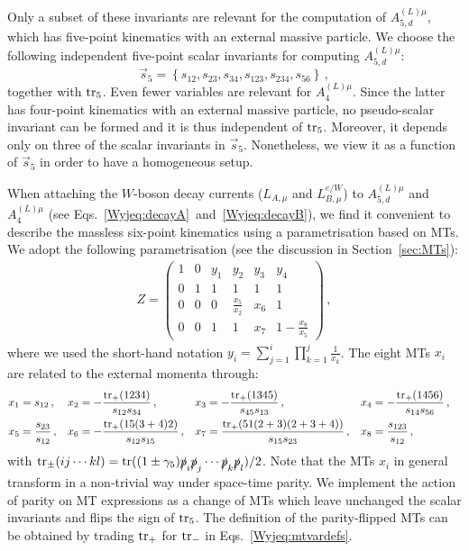 \documentclass[main.tex]{subfiles}
\begin{document}
Only a subset of these invariants are relevant for the computation of $A_{5,d}^{(L)\mu}$, which has five-point kinematics with an external massive particle. We choose the following independent five-point scalar invariants for computing $A_{5,d}^{(L)\mu}$:
\begin{equation}
\vec{s}_{5} = \left\{ s_{12},s_{23},s_{34},s_{123},s_{234},s_{56}\right\} \,,
\label{Wyjeq:sijs5pt}
\end{equation}
together with $\operatorname{\rm tr}_5$. Even fewer variables are relevant for $A_{4}^{(L)\mu}$. Since the latter has four-point kinematics with an external massive particle, no pseudo-scalar invariant can be formed and it is thus independent of $\operatorname{\rm tr}_5$. Moreover, it depends only on three of the scalar invariants in $\vec{s}_5$. Nonetheless, we view it as a function of $\vec{s}_{5}$ in order to have a homogeneous setup.

When attaching the $W$-boson decay currents ($L_{A,\mu}$ and $L^{e/W}_{B,\mu}$) to $A_{5,d}^{(L)\mu}$ and $A_{4}^{(L)\mu}$ (see Eqs.~\ref{Wyjeq:decayA}~and~\ref{Wyjeq:decayB}), we find it convenient to describe the massless six-point kinematics using a parametrisation based on MTs.
We adopt the following parametrisation (see the discussion in Section~\ref{sec:MTs}):
\begin{align}
  Z =
  \begin{pmatrix}
    1 & 0 & y_1 & y_2 & y_3 & y_4\\
    0 & 1 & 1   & 1   & 1   & 1 \\
    0 & 0 & 0   & \tfrac{x_5}{x_2} & x_6 & 1 \\
    0 & 0 & 1   & 1   & x_7 & 1-\tfrac{x_8}{x_5}
  \end{pmatrix} \,,
  \label{Wyjeq:ZmatrixW}
\end{align}
where we used the short-hand notation $y_i = \sum_{j=1}^{i} \prod_{k=1}^{j} \frac{1}{x_k}$. The eight MTs $x_i$ are related to the external momenta through:
\begin{align}
  x_1 &=  s_{12} \,, &
  x_2 &= -\frac{\operatorname{\rm tr}_+(1234)}{s_{12}s_{34}} \,, &
  x_3 &= -\frac{\operatorname{\rm tr}_+(1345)}{s_{45}s_{13}} \,, &
  x_4 &= -\frac{\operatorname{\rm tr}_+(1456)}{s_{14}s_{56}} \,, \nonumber \\
  x_5 &=  \frac{s_{23}}{s_{12}} \,, &
  x_6 &= -\frac{\operatorname{\rm tr}_+(15(3+4)2)}{s_{12}s_{15}} \,, &
  x_7 &=  \frac{\operatorname{\rm tr}_+(51(2+3)(2+3+4))}{s_{15} s_{23}} \,, &
  x_8 &=  \frac{s_{123}}{s_{12}} \,, &
\label{Wyjeq:mtvardefs}
\end{align}
with $\operatorname{\rm tr}_{\pm}(ij \cdots kl) = \operatorname{\rm tr}((1\pm\gamma_5)\slashed{p}_i\slashed{p}_j \cdots\slashed{p}_k\slashed{p}_l)/2$. Note that the MTs $x_i$ in general transform in a non-trivial way under space-time parity. We implement the action of parity on MT expressions as a change of MTs which leave unchanged the scalar invariants and flips the sign of $\operatorname{\rm tr}_5$. The definition of the parity-flipped MTs can be obtained by trading $\operatorname{\rm tr}_+$ for $\operatorname{\rm tr}_-$ in Eqs.~\ref{Wyjeq:mtvardefs}. 
\end{document}
